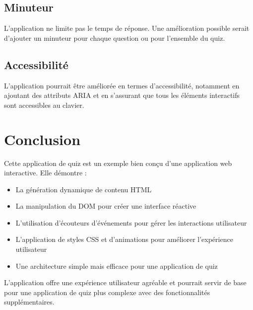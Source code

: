 \documentclass{article}
\begin{document}
\subsection{Minuteur}
L'application ne limite pas le temps de réponse. Une amélioration possible serait d'ajouter un minuteur pour chaque question ou pour l'ensemble du quiz.

\subsection{Accessibilité}
L'application pourrait être améliorée en termes d'accessibilité, notamment en ajoutant des attributs ARIA et en s'assurant que tous les éléments interactifs sont accessibles au clavier.

\section{Conclusion}
Cette application de quiz est un exemple bien conçu d'une application web interactive. Elle démontre :
\begin{itemize}
    \item La génération dynamique de contenu HTML
    \item La manipulation du DOM pour créer une interface réactive
    \item L'utilisation d'écouteurs d'événements pour gérer les interactions utilisateur
    \item L'application de styles CSS et d'animations pour améliorer l'expérience utilisateur
    \item Une architecture simple mais efficace pour une application de quiz
\end{itemize}

L'application offre une expérience utilisateur agréable et pourrait servir de base pour une application de quiz plus complexe avec des fonctionnalités supplémentaires.
\end{document}
